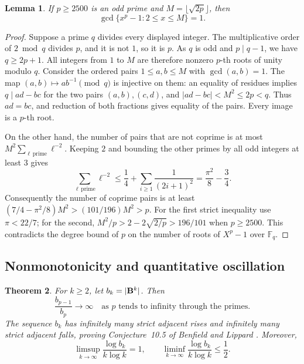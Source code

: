 \documentclass[11pt,a4paper]{article}
\newtheorem{SourceRbiKtheorem}{Theorem}
\newtheorem{SourceRbiKlemma}[SourceRbiKtheorem]{Lemma}
\begin{document}
\begin{SourceRbiKlemma}\label{R18K:lem:gcd}
If \(p\ge2500\) is an odd prime and \(M=\lfloor\sqrt{2p}\rfloor\), then
\[
 \gcd\{x^p-1:2\le x\le M\}=1.
\]
\end{SourceRbiKlemma}

\begin{proof}
Suppose a prime \(q\) divides every displayed integer. The
multiplicative order of \(2\bmod q\) divides \(p\), and it is not \(1\),
so it is \(p\). As \(q\) is odd and \(p\mid q-1\), we have
\(q\ge2p+1\). All integers from \(1\) to \(M\) are therefore
nonzero \(p\)-th roots of unity modulo \(q\).
Consider the ordered pairs \(1\le a,b\le M\) with \(\gcd(a,b)=1\).
The map \((a,b)\mapsto a b^{-1}\pmod q\) is injective on them:
an equality of residues implies \(q\mid ad-bc\) for the two pairs
\((a,b),(c,d)\), and \(|ad-bc|<M^2\le2p<q\).
Thus \(ad=bc\), and reduction of both fractions gives equality of
the pairs. Every image is a \(p\)-th root.

On the other hand, the number of pairs that are not coprime is at
most \(M^2\sum_{\ell\,\mathrm{prime}}\ell^{-2}\). Keeping \(2\)
and bounding the other primes by all odd integers at least \(3\)
gives
\[
 \sum_{\ell\,\mathrm{prime}}\ell^{-2}
 \le \frac14+\sum_{i\ge1}\frac1{(2i+1)^2}
 =\frac{\pi^2}{8}-\frac34 .
\]
Consequently the number of coprime pairs is at least
\((7/4-\pi^2/8)M^2>(101/196)M^2>p\).
For the first strict inequality use \(\pi<22/7\);
for the second, \(M^2/p>2-2\sqrt{2/p}>196/101\)
when \(p\ge2500\).
This contradicts the degree bound of \(p\) on the number of roots of
\(X^p-1\) over \(\mathbb F_q\).
\end{proof}

\subsection{Nonmonotonicity and quantitative oscillation}

\begin{SourceRbiKtheorem}\label{R18K:thm:main}
For \(k\ge2\), let \(b_k=|\mathbf B^k|\). Then
\[
 \frac{b_{p-1}}{b_p}\longrightarrow\infty
 \quad\text{as }p\text{ tends to infinity through the primes}.
\]
The sequence \(b_k\) has infinitely many strict adjacent rises and
infinitely many strict adjacent falls, proving Conjecture~10.5 of
Benfield and Lippard \cite{R18K:BL}. Moreover,
\[
 \limsup_{k\to\infty}\frac{\log b_k}{k\log k}=1,
 \qquad
 \liminf_{k\to\infty}\frac{\log b_k}{k\log k}\le\frac12.
\]
\end{SourceRbiKtheorem}
\end{document}
